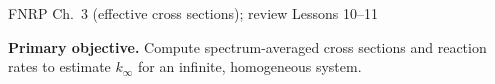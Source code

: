 \providecommand{\dd}{\,\mathrm{d}}
\AtBeginDocument{%
\setlength{\abovedisplayskip}{4pt plus 1pt minus 1pt}
\setlength{\belowdisplayskip}{4pt plus 1pt minus 1pt}
\setlength{\abovedisplayshortskip}{3pt plus 1pt}
\setlength{\belowdisplayshortskip}{3pt plus 1pt}
\setlength{\jot}{2pt}
}

  {FNRP Ch.~3 (effective cross sections); review Lessons 10--11}

\MakeHandoutTitle
\textcolor{KSUDeepPurple}{\textbf{Primary objective.}}
Compute spectrum-averaged cross sections and reaction rates to estimate
$k_{\infty}$ for an infinite, homogeneous system.
\par\vspace{5pt}

